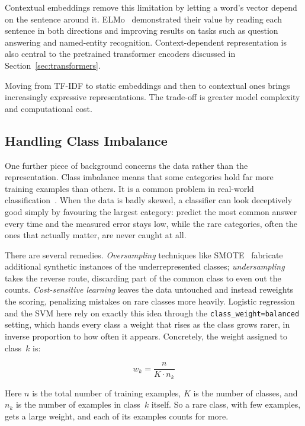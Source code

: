 Contextual embeddings remove this limitation by letting a word's vector depend on the sentence around it. ELMo~\cite{peters2018deep} demonstrated their value by reading each sentence in both directions and improving results on tasks such as question answering and named-entity recognition. Context-dependent representation is also central to the pretrained transformer encoders discussed in Section~\ref{sec:transformers}.

Moving from TF-IDF to static embeddings and then to contextual ones brings increasingly expressive representations. The trade-off is greater model complexity and computational cost.

\subsection{Handling Class Imbalance}
\label{sec:class_imbalance}

One further piece of background concerns the data rather than the representation. Class imbalance means that some categories hold far more training examples than others. It is a common problem in real-world classification~\cite{chawla2002smote}. When the data is badly skewed, a classifier can look deceptively good simply by favouring the largest category: predict the most common answer every time and the measured error stays low, while the rare categories, often the ones that actually matter, are never caught at all.

There are several remedies. \emph{Oversampling} techniques like SMOTE~\cite{chawla2002smote} fabricate additional synthetic instances of the underrepresented classes; \emph{undersampling} takes the reverse route, discarding part of the common class to even out the counts. \emph{Cost-sensitive learning} leaves the data untouched and instead reweights the scoring, penalizing mistakes on rare classes more heavily. Logistic regression and the SVM here rely on exactly this idea through the \texttt{class\_weight=balanced} setting, which hands every class a weight that rises as the class grows rarer, in inverse proportion to how often it appears. Concretely, the weight assigned to class~$k$ is:

\begin{equation}
w_k = \frac{n}{K \cdot n_k}
\label{eq:class_weight}
\end{equation}

\noindent Here $n$ is the total number of training examples, $K$ is the number of classes, and $n_k$ is the number of examples in class~$k$ itself. So a rare class, with few examples, gets a large weight, and each of its examples counts for more.

